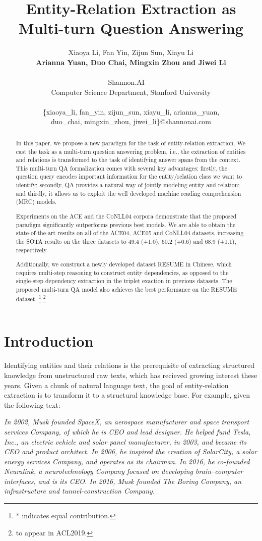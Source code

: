 \documentclass[11pt,a4paper]{article}
\title{Entity-Relation Extraction as Multi-turn Question Answering}
\author{Xiaoya Li, Fan Yin, Zijun Sun, Xiayu Li\\ {\bf Arianna Yuan, Duo Chai, Mingxin Zhou and Jiwei Li }\\
~~\\ Shannon.AI
~~\\ Computer Science Department, Stanford University \\~~\\
   { \{xiaoya\_li, fan\_yin, zijun\_sun, xiayu\_li, arianna\_yuan,  } \\
   { duo\_chai, mingxin\_zhou, jiwei\_li\}@shannonai.com}
    }
\date{}
\begin{document}
\maketitle

\begin{abstract}
  In this paper, we propose a new paradigm for the task of entity-relation extraction. 
  We 
 cast the task as a multi-turn question answering problem, i.e., the extraction of entities and relations is transformed to the task of identifying answer spans from the context. 
     This multi-turn QA formalization comes with several key advantages: firstly, the question query encodes important information for the entity/relation class we want to identify;
  secondly, QA provides a natural way of jointly modeling entity and relation; and thirdly, it allows us to exploit the well developed machine reading comprehension  (MRC) models. 
  
Experiments on the ACE and the CoNLL04 corpora demonstrate that the proposed paradigm significantly outperforms previous best models. 
We are able to obtain the state-of-the-art results on all of the ACE04, ACE05 and CoNLL04 datasets, increasing the SOTA results on the three datasets to 49.4 (+1.0), 60.2 (+0.6) and 68.9 (+1.1), respectively. 

Additionally, we construct  a newly developed dataset RESUME in Chinese,  
which requires multi-step reasoning to construct entity dependencies, as opposed to the single-step dependency extraction in the triplet exaction in previous datasets. 
The proposed multi-turn QA model also achieves the best performance on the RESUME dataset. \footnote{* indicates equal contribution.} \footnote{to appear in ACL2019.}
\end{abstract}



\section{Introduction}
Identifying entities and their relations is the prerequisite of extracting structured knowledge from unstructured raw texts, which has recieved growing interest these years. 
Given a chunk of natural language text, the goal of entity-relation extraction is to transform it to a structural knowledge base. For example, given the following text:

{\it 
In  2002, Musk founded SpaceX, an aerospace manufacturer and space transport services Company, of which he is CEO and lead designer. He helped fund Tesla, Inc., an electric vehicle and solar panel manufacturer, in 2003, and became its CEO and product architect. In 2006, he inspired the creation of SolarCity, a solar energy services Company, and operates as its chairman.  In  2016, he co-founded Neuralink, a neurotechnology Company focused on developing brain–computer interfaces, and is its CEO. In  2016, Musk founded The Boring Company, an infrastructure and tunnel-construction Company.}
\end{document}
